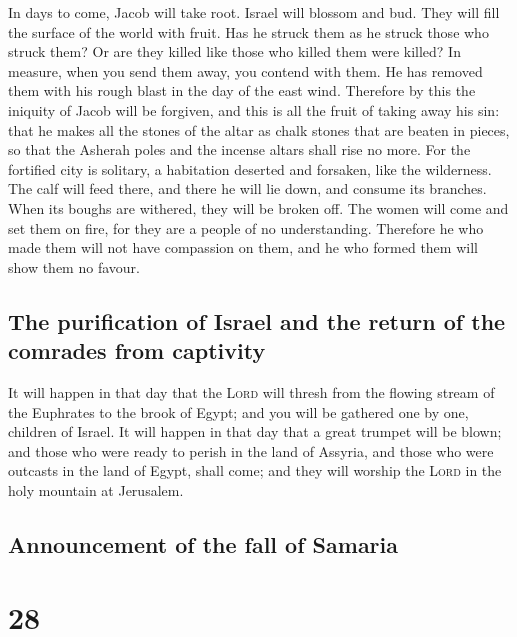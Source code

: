  In days to come, Jacob will take root. Israel will
blossom and bud. They will fill the surface of the world with fruit.
 Has he struck them as he struck those who struck them? Or
are they killed like those who killed them were killed? 
In measure, when you send them away, you contend with them. He has
removed them with his rough blast in the day of the east wind.
 Therefore by this the iniquity of Jacob will be forgiven,
and this is all the fruit of taking away his sin: that he makes all the
stones of the altar as chalk stones that are beaten in pieces, so that
the Asherah poles and the incense altars shall rise no more.
 For the fortified city is solitary, a habitation
deserted and forsaken, like the wilderness. The calf will feed there,
and there he will lie down, and consume its branches. 
When its boughs are withered, they will be broken off. The women will
come and set them on fire, for they are a people of no understanding.
Therefore he who made them will not have compassion on them, and he who
formed them will show them no favour.

\hypertarget{the-purification-of-israel-and-the-return-of-the-comrades-from-captivity}{%
\subsection{The purification of Israel and the return of the comrades
from
captivity}\label{the-purification-of-israel-and-the-return-of-the-comrades-from-captivity}}

 It will happen in that day that the \textsc{Lord} will
thresh from the flowing stream of the Euphrates to the brook of Egypt;
and you will be gathered one by one, children of Israel. 
It will happen in that day that a great trumpet will be blown; and those
who were ready to perish in the land of Assyria, and those who were
outcasts in the land of Egypt, shall come; and they will worship the
\textsc{Lord} in the holy mountain at Jerusalem.

\hypertarget{announcement-of-the-fall-of-samaria}{%
\subsection{Announcement of the fall of
Samaria}\label{announcement-of-the-fall-of-samaria}}

\hypertarget{section-27}{%
\section{28}\label{section-27}}

